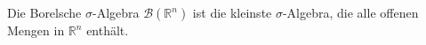 \begin{definition}
    Die Borelsche $\sigma$-Algebra $\mathcal{B}(\mathbb{R}^n)$ ist die kleinste $\sigma$-Algebra, die alle offenen Mengen in $\mathbb{R}^n$ enthält.
\end{definition}